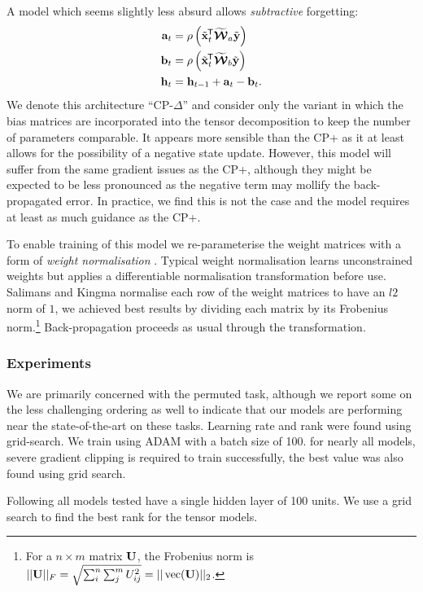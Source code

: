 A model which seems slightly less absurd allows \emph{subtractive} forgetting:
\begin{align}\label{eq:cpdelta}
	\mathbf{a}_t &= \rho\left(\tilde{\mathbf{x}}^{\mkern-1.5mu\mathsf{T}}_t\widetilde{\bm{\mathcal{W}}}_a\tilde{\mathbf{y}}\right)\\
	\mathbf{b}_t &= \rho\left(\tilde{\mathbf{x}}^{\mkern-1.5mu\mathsf{T}}_t\widetilde{\bm{\mathcal{W}}}_b\tilde{\mathbf{y}}\right)\\
	\mathbf{h}_t &= \mathbf{h}_{t-1} + \mathbf{a}_t - \mathbf{b}_t.
\end{align} We denote this architecture ``CP-\(\Delta\)'' and consider only the variant in
which the bias matrices are incorporated into the tensor decomposition to keep the number
of parameters comparable. It appears more sensible
than the CP+ as it at least allows for the possibility of a negative state update.
However, this model will suffer from the same gradient issues as the CP+, although
they might be expected to be less pronounced as the negative term may
mollify the back-propagated error. In practice, we find this is not the case and
the model requires at least as much guidance as the CP+.

To enable training of this model we re-parameterise the weight matrices with a
form of \emph{weight normalisation} \autocite{Salimans2016a}. Typical
weight normalisation learns unconstrained weights but applies a differentiable
normalisation transformation before use. Salimans and Kingma normalise each
row of the weight matrices to have an \(l2\) norm of \(1\), we achieved
best results by dividing each matrix by its Frobenius norm.\footnote{
For a \(n \times m\) matrix \(\mathbf{U}\), the Frobenius norm is
\(||\mathbf{U}||_F = \sqrt{\sum_i^n\sum_j^mU_{ij}^2} = ||\operatorname{vec}(\mathbf{U})||_2\).}
Back-propagation proceeds as usual through the transformation.

\subsubsection{Experiments}
We are primarily concerned with the permuted task, although we report some
on the less challenging ordering as well to indicate that our models are
performing near the state-of-the-art on these tasks. Learning rate and rank
were found using grid-search. We train using ADAM with a batch size of 100.
for nearly all models, severe gradient clipping \autocite{Pascanu2013} is
required to train successfully, the best value was also found using grid
search.

Following \autocite{Le2015} all models tested have a single hidden layer of 100 units.
We use a grid search to find the best rank for the tensor models.

